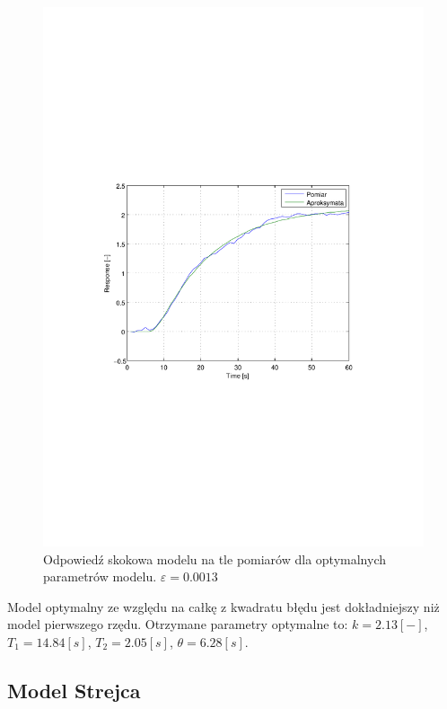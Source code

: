\documentclass[12pt]{article}
\begin{document}
\begin{figure}[!htb]
	\begin{center}
		\includegraphics[width=14cm,trim=3cm 9cm 3cm 9cm,clip]
		{../res/img/k2_opt.pdf}
	\end{center}
	\caption{Odpowiedź skokowa modelu na tle pomiarów dla optymalnych parametrów
	modelu. $\varepsilon=0.0013$}
\end{figure}

Model optymalny ze względu na całkę z kwadratu błędu jest dokładniejszy niż
model pierwszego rzędu. Otrzymane parametry optymalne to:
$k=2.13[-]$, $T_1=14.84[s]$, $T_2=2.05[s]$, $\theta=6.28[s]$.

\newpage

\subsection{Model Strejca}
\end{document}
